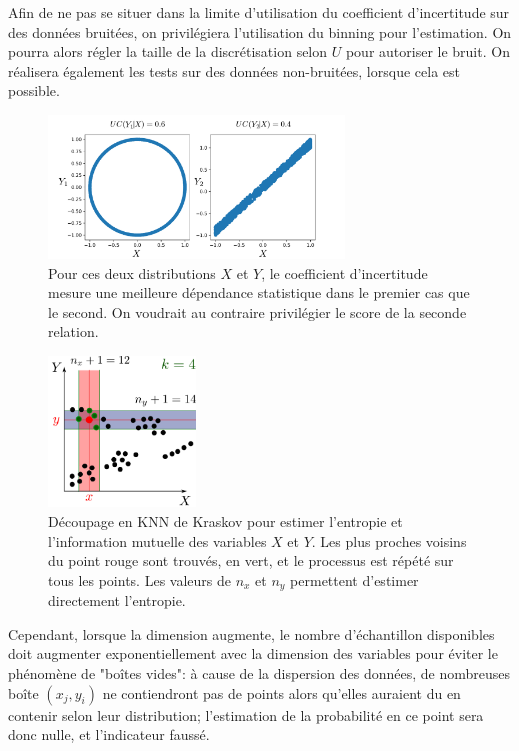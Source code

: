 Afin de ne pas se situer dans la limite d'utilisation du coefficient d'incertitude sur des données bruitées, on privilégiera l'utilisation du binning pour l'estimation. On pourra alors régler la taille de la discrétisation selon $U$ pour autoriser le bruit. On réalisera également les tests sur des données non-bruitées, lorsque cela est possible.


\begin{figure}
\centering
\includegraphics[width=0.7\textwidth]{exemple_limite.pdf}
\caption{Pour ces deux distributions $X$ et $Y$, le coefficient d'incertitude mesure une meilleure dépendance statistique dans le premier cas que le second. On voudrait au contraire privilégier le score de la seconde relation.}
\label{fig:exemple-limite}
\end{figure}

\begin{figure}
        \centering
        \includegraphics[width=0.35\textwidth]{kraskov.pdf}
        \caption{Découpage en KNN de Kraskov pour estimer l'entropie et l'information mutuelle des variables $X$ et $Y$. Les plus proches voisins du point rouge sont trouvés, en vert, et le processus est répété sur tous les points. Les valeurs de $n_x$ et $n_y$ permettent d'estimer directement l'entropie.}
        \label{fig:kraskov}
\end{figure}
Cependant, lorsque la dimension augmente, le nombre d'échantillon disponibles doit augmenter exponentiellement avec la dimension des variables pour éviter le phénomène de "boîtes vides": à cause de la dispersion des données, de nombreuses boîte $(x_j,y_i)$ ne contiendront pas de points alors qu'elles auraient du en contenir selon leur distribution; l'estimation de la probabilité en ce point sera donc nulle, et l'indicateur faussé. 

